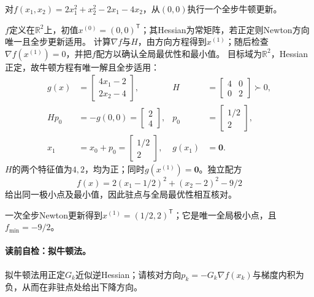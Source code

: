 \label{struct:V1-C08-CH20}
\begin{example}[正定二次函数的一步Newton更新]\label{exm:V1-C08-newton-quadratic}
对$f(x_1,x_2)=2x_1^2+x_2^2-2x_1-4x_2$，从$(0,0)$执行一个全步牛顿更新。
\end{example}
\begin{solution}
\SolGiven $f$定义在$\mathbb R^2$上，初值$x^{(0)}=(0,0)^{\mathsf T}$；其Hessian为常矩阵，若正定则Newton方向唯一且全步更新适用。
\SolPlan 计算$\nabla f$与$H$，由方向方程得到$x^{(1)}$；随后检查$\nabla f(x^{(1)})=0$，并把$f$配方以确认全局最优性和最小值。
\SolDerive
目标域为$\mathbb R^2$，Hessian正定，故牛顿方程有唯一解且全步适用：
\[
\begin{aligned}
g(x)&=\begin{bmatrix}4x_1-2\\2x_2-4\end{bmatrix},
&H&=\begin{bmatrix}4&0\\0&2\end{bmatrix}\succ0,\\
H p_0&=-g(0,0)=\begin{bmatrix}2\\4\end{bmatrix},
&p_0&=\begin{bmatrix}1/2\\2\end{bmatrix},\\
x_1&=x_0+p_0=\begin{bmatrix}1/2\\2\end{bmatrix},
&g(x_1)&=\boldsymbol0.
\end{aligned}
\]
\SolCheck $H$的两个特征值为$4,2$，均为正；同时$g(x^{(1)})=\boldsymbol0$。独立配方
\[
f(x)=2(x_1-1/2)^2+(x_2-2)^2-9/2
\]
给出同一极小点及最小值，因此驻点与全局最优性相互核对。

\SolAnswer 一次全步Newton更新得到$x^{(1)}=(1/2,2)^{\mathsf T}$；它是唯一全局极小点，且$f_{\min}=-9/2$。
\end{solution}


\paragraph{读前自检：拟牛顿法。}拟牛顿法用正定$G_k$近似逆Hessian；请核对方向$p_k=-G_k\nabla f(x_k)$与梯度内积为负，从而在非驻点处给出下降方向。\par
